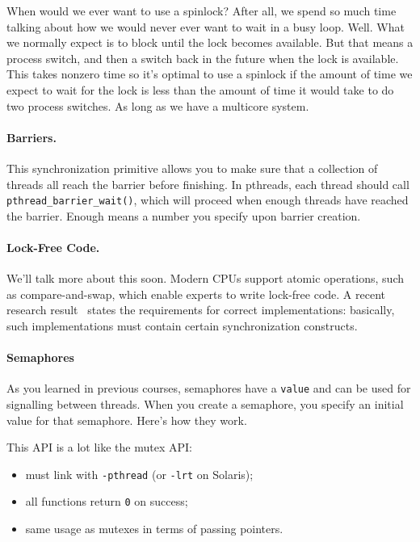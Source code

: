 \documentclass[a4paper]{report}
\begin{document}
When would we ever want to use a spinlock? After all, we spend so much time talking about how we would never ever want to wait in a busy loop. Well. What we normally expect is to block until the lock becomes available. But that means a process switch, and then a switch back in the future when the lock is available. This takes nonzero time so it's optimal to use a spinlock if the amount of time we expect to wait for the lock is less than the amount of time it would take to do two process switches. As long as we have a multicore system.


\paragraph{Barriers.} This synchronization primitive allows you 
to make sure that a collection of threads all reach the
barrier before finishing. In pthreads, each thread should call
\verb+pthread_barrier_wait()+, which will proceed when enough threads
have reached the barrier. Enough means a number you specify upon
barrier creation.

\paragraph{Lock-Free Code.} We'll talk more about this soon.
Modern CPUs support atomic operations, such as compare-and-swap, which
enable experts to write lock-free code. A recent research 
result~\cite{mckenney11:_concur,Attiya:2011:LOE:1926385.1926442} states the requirements for correct implementations: basically,
such implementations must contain certain synchronization constructs.

\paragraph{Semaphores}
As you learned in previous courses, semaphores have a {\tt value} and
can be used for signalling between threads. When you create a semaphore,
you specify an initial value for that semaphore. Here's how they work.

This API is a lot like the mutex API:
  \begin{itemize}
    \item must link with {\tt -pthread} (or {\tt -lrt} on Solaris);
    \item all functions return {\tt 0} on success;
    \item same usage as mutexes in terms of passing pointers.
  \end{itemize}
\end{document}
